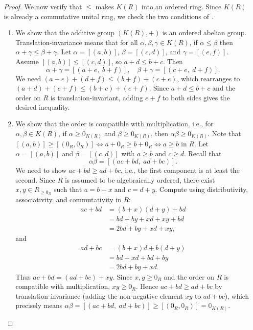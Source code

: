 \begin{proof}
    We now verify that $\leq$ makes $K(R)$ into an ordered ring. Since $K(R)$ is already a commutative unital ring, we check the two conditions of .
    \begin{enumerate}
        \item We show that the additive group $(K(R),+)$ is an ordered abelian group. Translation-invariance means that for all $\alpha,\beta,\gamma \in K(R)$, if $\alpha \leq \beta$ then $\alpha + \gamma \leq \beta + \gamma$. Let $\alpha = [(a,b)]$, $\beta = [(c,d)]$, and $\gamma = [(e,f)]$. Assume $[(a,b)] \leq [(c,d)]$, so $a + d \leq b + c$. Then
        $$\alpha + \gamma = [(a+e,\; b+f)], \quad \beta + \gamma = [(c+e,\; d+f)].$$
        We need $(a+e) + (d+f) \leq (b+f) + (c+e)$, which rearranges to $(a+d) + (e+f) \leq (b+c) + (e+f)$. Since $a + d \leq b + c$ and the order on $R$ is translation-invariant, adding $e + f$ to both sides gives the desired inequality.

        \item We show that the order is compatible with multiplication, i.e., for $\alpha,\beta \in K(R)$, if $\alpha \geq 0_{K(R)}$ and $\beta \geq 0_{K(R)}$, then $\alpha\beta \geq 0_{K(R)}$. Note that $[(a,b)] \geq [(0_R,0_R)] \iff a + 0_R \geq b + 0_R \iff a \geq b$ in $R$. Let $\alpha = [(a,b)]$ and $\beta = [(c,d)]$ with $a \geq b$ and $c \geq d$. Recall that
        $$\alpha\beta = [(ac+bd,\; ad+bc)].$$
        We need to show $ac + bd \geq ad + bc$, i.e., the first component is at least the second.
        Since $R$ is assumed to be algebraically ordered, there exist $x,y \in R_{\geq 0_R}$ such that $a = b+x$ and $c = d+y$. Compute using distributivity, associativity, and commutativity in $R$:
        $$\begin{aligned}
            ac + bd &= (b+x)(d+y) + bd \\
            &= bd + by + xd + xy + bd \\
            &= 2bd + by + xd + xy,
        \end{aligned}$$
        and
        $$\begin{aligned}
            ad + bc &= (b+x)d + b(d+y) \\
            &= bd + xd + bd + by \\
            &= 2bd + by + xd.
        \end{aligned}$$
        Thus $ac + bd = (ad + bc) + xy$. Since $x,y \geq 0_R$ and the order on $R$ is compatible with multiplication, $xy \geq 0_R$. Hence $ac + bd \geq ad + bc$ by translation-invariance (adding the non-negative element $xy$ to $ad+bc$), which precisely means $\alpha\beta = [(ac+bd,\; ad+bc)] \geq [(0_R,0_R)] = 0_{K(R)}$.
    \end{enumerate}


\end{proof}
